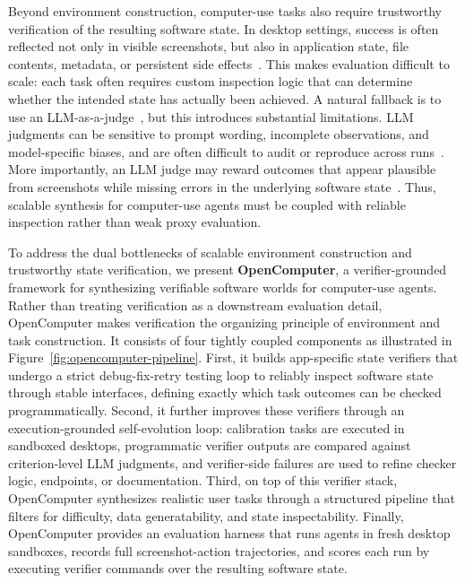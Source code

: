 \documentclass{llmxive}
\providecommand{\ours}{OpenComputer\xspace}
\begin{document}
Beyond environment construction, computer-use tasks also require trustworthy verification of the resulting software state. In desktop settings, success is often reflected not only in visible screenshots, but also in application state, file contents, metadata, or persistent side effects~\cite{xie2024osworld,bonatti2024windows}. This makes evaluation difficult to scale: each task often requires custom inspection logic that can determine whether the intended state has actually been achieved. A natural fallback is to use an LLM-as-a-judge~\cite{liu2023g,kim2024prometheus}, but this introduces substantial limitations. LLM judgments can be sensitive to prompt wording, incomplete observations, and model-specific biases, and are often difficult to audit or reproduce across runs~\citep{wang2024large,li2025generation,thakur2025judging,zheng2023judging}. More importantly, an LLM judge may reward outcomes that appear plausible from screenshots while missing errors in the underlying software state~\citep{sumyk2026cuaaudit,cui2026agentic}. Thus, scalable synthesis for computer-use agents must be coupled with reliable inspection rather than weak proxy evaluation.

To address the dual bottlenecks of scalable environment construction and trustworthy state verification, we present \textbf{\ours}, a verifier-grounded framework for synthesizing verifiable software worlds for computer-use agents. Rather than treating verification as a downstream evaluation detail, \ours makes verification the organizing principle of environment and task construction.
It consists of four tightly coupled components as illustrated in Figure~\ref{fig:opencomputer-pipeline}. First, it builds app-specific state verifiers that undergo a strict debug-fix-retry testing loop to reliably inspect software state through stable interfaces, defining exactly which task outcomes can be checked programmatically. Second, it further improves these verifiers through an execution-grounded self-evolution loop: calibration tasks are executed in sandboxed desktops, programmatic verifier outputs are compared against criterion-level LLM judgments, and verifier-side failures are used to refine checker logic, endpoints, or documentation. Third, on top of this verifier stack, \ours synthesizes realistic user tasks through a structured pipeline that filters for difficulty, data generatability, and state inspectability. Finally, \ours provides an evaluation harness that runs agents in fresh desktop sandboxes, records full screenshot-action trajectories, and scores each run by executing verifier commands over the resulting software state.
\end{document}
